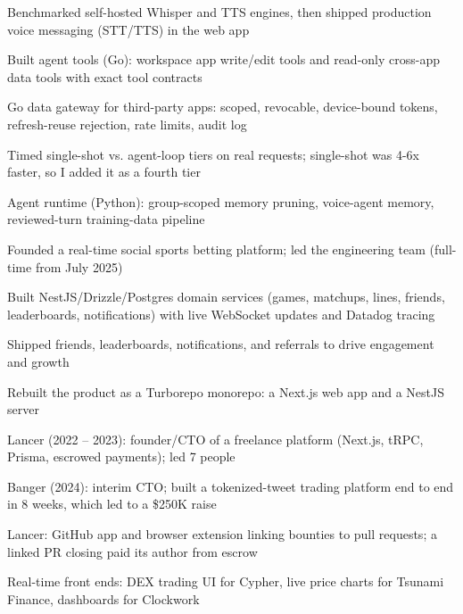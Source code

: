 \documentclass[print]{jack-resume}
\begin{document}
\begin{tightemize}
    \item Benchmarked self-hosted Whisper and TTS engines, then shipped production voice messaging (STT/TTS) in the web app
    \item Built agent tools (Go): workspace app write/edit tools and read-only cross-app data tools with exact tool contracts
    \item Go data gateway for third-party apps: scoped, revocable, device-bound tokens, refresh-reuse rejection, rate limits, audit log
    \item Timed single-shot vs. agent-loop tiers on real requests; single-shot was 4-6x faster, so I added it as a fourth tier
    \item Agent runtime (Python): group-scoped memory pruning, voice-agent memory, reviewed-turn training-data pipeline
\end{tightemize}
\sectionsep

\begin{tightemize}
    \item Founded a real-time social sports betting platform; led the engineering team (full-time from July 2025)
    \item Built NestJS/Drizzle/Postgres domain services (games, matchups, lines, friends, leaderboards, notifications) with live WebSocket updates and Datadog tracing
    \item Shipped friends, leaderboards, notifications, and referrals to drive engagement and growth
    \item Rebuilt the product as a Turborepo monorepo: a Next.js web app and a NestJS server
\end{tightemize}
\sectionsep

\begin{tightemize}
    \item Lancer (2022 -- 2023): founder/CTO of a freelance platform (Next.js, tRPC, Prisma, escrowed payments); led 7 people
    \item Banger (2024): interim CTO; built a tokenized-tweet trading platform end to end in 8 weeks, which led to a \$250K raise
    \item Lancer: GitHub app and browser extension linking bounties to pull requests; a linked PR closing paid its author from escrow
    \item Real-time front ends: DEX trading UI for Cypher, live price charts for Tsunami Finance, dashboards for Clockwork
\end{tightemize}
\sectionsep
\end{document}
